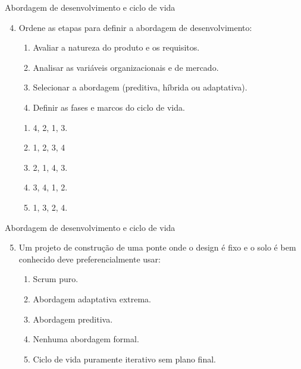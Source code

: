 \documentclass{beamer}
\begin{document}
\begin{frame}{Abordagem de desenvolvimento e ciclo de vida}
	\begin{enumerate}
		\setcounter{enumi}{3}
		\justifying
		\item Ordene as etapas para definir a abordagem de desenvolvimento:
		\begin{enumerate}[I]
			\item Avaliar a natureza do produto e os requisitos.
			\item Analisar as variáveis organizacionais e de mercado.
			\item Selecionar a abordagem (preditiva, híbrida ou adaptativa).
			\item Definir as fases e marcos do ciclo de vida.
		\end{enumerate}
		\begin{enumerate}[a]
			\item 4, 2, 1, 3.
			\item \alert<2>{1, 2, 3, 4}
			\item 2, 1, 4, 3.
			\item 3, 4, 1, 2.
			\item 1, 3, 2, 4.
		\end{enumerate}
	\end{enumerate}
\end{frame}

\begin{frame}{Abordagem de desenvolvimento e ciclo de vida}
	\begin{enumerate}
		\setcounter{enumi}{4}
		\justifying
		\item Um projeto de construção de uma ponte onde o design é fixo e o solo é bem conhecido deve preferencialmente usar:
		\begin{enumerate}[a]
			\item Scrum puro.
			\item Abordagem adaptativa extrema.
			\item \alert<2>{Abordagem preditiva.}
			\item Nenhuma abordagem formal.
			\item Ciclo de vida puramente iterativo sem plano final.
		\end{enumerate}
	\end{enumerate}
\end{frame}
\end{document}
